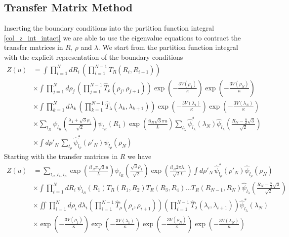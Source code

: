 \subsection{Transfer Matrix Method}

Inserting the boundary conditions into the partition function integral \eqref{col_z_int_intact} we are able to use the eigenvalue equations to contract the transfer matrices in $R$, $\rho$ and $\lambda$. We start from the partition function integral with the explicit representation of the boundary conditions
%
\begin{equation}\label{col_z_int_intact2}
\begin{split}
Z\left(u\right) &= \int\prod^{N}_{i=1}dR_i\,\left(\prod^{N-1}_{i=1}T_{R}(R_i,R_{i+1})\right)\\
&\times\int\prod^{N}_{j=1}d\rho_j\,\left(\prod^{N-1}_{j=1}\hat{T}_{\rho}(\rho_j,\rho_{j+1})\right)\exp\left(-\frac{3V(\rho_{1})}{\kappa}\right)\exp\left(-\frac{3V(\rho_{N})}{\kappa}\right)\\
&\times\int\prod^{N}_{k=1}d\lambda_k\,\left(\prod^{N-1}_{k=1}\hat{T}_{\lambda}(\lambda_k,\lambda_{k+1})\right)\exp\left(-\frac{3V(\lambda_{1})}{\kappa}\right)\exp\left(-\frac{3V(\lambda_{N})}{\kappa}\right)\\
&\times\sum_{l_R}\psi_{l_R}\left(\frac{\lambda_1 + \sqrt{3}\rho_1}{\sqrt{2}}\right)\psi_{l_R}\left(R_{1}\right)\exp\left(\frac{il_{R}\sqrt{3}\pi u}{L}\right)\sum_{l_\lambda}\hat{\psi}^{*}_{l_\lambda}\left(\lambda_{N}\right)\hat{\psi}_{l_\lambda}\left(\frac{R_N-\frac{u}{2}\sqrt{3}}{\sqrt{2}}\right)\\
&\times\int dp'_N\,\sum_{l_\rho}\hat{\psi}^{*}_{l_\rho}\left(\rho'_{N}\right)\hat{\psi}_{l_\rho}\left(\rho_{N}\right)
\end{split}
\end{equation}
%
Starting with the transfer matrices in $R$ we have
% 
\begin{align}\label{col_z_int_intact3}
Z\left(u\right) &=\sum_{l_R,l_\lambda,l_\rho}\exp\left(\frac{il_{R}\pi \sqrt{3}u}{L}\right)\psi_{l_R}\left( \frac{\sqrt{3}\rho_1}{\sqrt{2}}\right)\exp\left(\frac{il_{R}2\pi\lambda_1}{\sqrt{2}L} \right)\int d\rho'_N\,\hat{\psi}^{*}_{l_\rho}\left(\rho'_{N}\right)\hat{\psi}_{l_\rho}\left(\rho_{N}\right)\nonumber\\
&\times\int\prod^{N}_{i=1}dR_i\,\psi_{l_R}\left(R_{1}\right)T_{R}\left(R_{1},R_{2}\right)T_{R}\left(R_{3},R_{4}\right)...T_{R}\left(R_{N-1},R_{N}\right)\hat{\psi}_{l_\lambda}\left(\frac{R_N-\frac{u}{2}\sqrt{3}}{\sqrt{2}}\right)\nonumber\\
&\times\iint\prod^{N}_{i=1}d\rho_i\,d\lambda_i\left(\prod^{N-1}_{i=1}\hat{T}_{\rho}(\rho_i,\rho_{i+1})\right)\left(\prod^{N-1}_{i=1}\hat{T}_{\lambda}(\lambda_i,\lambda_{i+1})\right)\hat{\psi}^{*}_{l_\lambda}\left(\lambda_{N}\right)\nonumber\\
&\times\exp\left(-\frac{3V(\rho_{1})}{\kappa}\right)\exp\left(-\frac{3V(\lambda_{1})}{\kappa}\right)\exp\left(-\frac{3V(\rho_{N})}{\kappa}\right)\exp\left(-\frac{3V(\lambda_{N})}{\kappa}\right)
\end{align}
